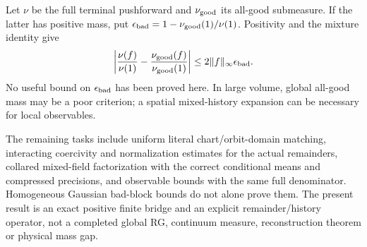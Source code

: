 Let \(\nu\) be the full terminal pushforward and \(\nu_{\rm good}\)
its all-good submeasure. If the latter has positive mass, put
\(\epsilon_{\rm bad}=1-\nu_{\rm good}(1)/\nu(1)\).
Positivity and the mixture identity give
\begin{equation}
 \left|\frac{\nu(f)}{\nu(1)}-
             \frac{\nu_{\rm good}(f)}{\nu_{\rm good}(1)}\right|
 \le2\|f\|_\infty\epsilon_{\rm bad}.
 \label{fps-mixture-bound}
\end{equation}
No useful bound on \(\epsilon_{\rm bad}\) has been proved here. In large
volume, global all-good mass may be a poor criterion; a spatial
mixed-history expansion can be necessary for local observables.

The remaining tasks include uniform literal chart/orbit-domain matching,
interacting coercivity and normalization estimates for the actual
remainders, collared mixed-field factorization with the correct
conditional means and compressed precisions, and observable bounds with
the same full denominator. Homogeneous Gaussian bad-block bounds do not
alone prove them. The present result is an exact positive finite bridge
and an explicit remainder/history operator, not a completed global RG,
continuum measure, reconstruction theorem or physical mass gap.
